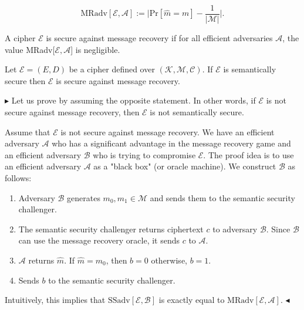 \documentclass[../lecture-notes.tex]{subfiles}
\begin{document}
\begin{equation*}
    \text{MRadv}[\mathcal{E}, \mathcal{A}] := \Bigg|\text{Pr}[\hat{m} = m] - \frac{1}{|\mathcal{M}|}\Bigg|.
\end{equation*}

\begin{definition} 
    A cipher $\mathcal{E}$ is secure against message recovery if for all efficient adversaries $\mathcal{A}$, the value MRadv[$\mathcal{E}, \mathcal{A}$] is negligible.
\end{definition}

\begin{theorem}
    Let $\mathcal{E} = (E, D)$ be a cipher defined over $(\mathcal{K}, \mathcal{M}, \mathcal{C})$. If $\mathcal{E}$ is semantically secure then $\mathcal{E}$ is secure against message recovery.
\end{theorem}

$\blacktriangleright$ 
Let us prove by assuming the opposite statement. 
In other words, if $\mathcal{E}$ is not secure against message recovery, then $\mathcal{E}$ is not semantically secure.

Assume that $\mathcal{E}$ is not secure against message recovery. 
We have an efficient adversary $\mathcal{A}$ who has a significant advantage in the 
message recovery game and an efficient adversary $\mathcal{B}$ who is trying to 
compromise $\mathcal{E}$.
The proof idea is to use an efficient adversary $\mathcal{A}$ as a "black box" (or oracle machine). %
We construct $\mathcal{B}$ as follows:
\begin{enumerate}
    \item Adversary $\mathcal{B}$ generates $m_0, m_1 \in \mathcal{M}$ and sends them to the semantic security challenger.
    \item The semantic security challenger returns ciphertext $c$ to adversary $\mathcal{B}$. Since $\mathcal{B}$ can use 
    the message recovery oracle, it sends $c$ to $\mathcal{A}$. 
    \item $\mathcal{A}$ returns $\hat{m}$. If $\hat{m} = m_0$, then $b = 0$ otherwise, $b = 1$.
    \item Sends $b$ to the semantic security challenger. 
\end{enumerate}

Intuitively, this implies that $\text{SSadv}[\mathcal{E}, \mathcal{B}]$ is exactly equal 
to $\text{MRadv}[\mathcal{E}, \mathcal{A}]$. $\blacktriangleleft$
\end{document}

